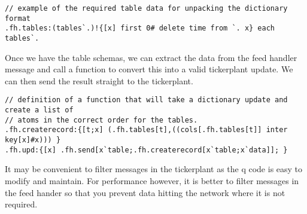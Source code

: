 \begin{lstlisting}
// example of the required table data for unpacking the dictionary format
.fh.tables:(tables`.)!{[x] first 0# delete time from `. x} each tables`.
\end{lstlisting}

Once we have the table schemas, we can extract the data from the feed handler message and call a function to convert this into
a valid tickerplant update. We can then send the result straight to the tickerplant.

\begin{lstlisting}
// definition of a function that will take a dictionary update and create a list of
// atoms in the correct order for the tables.
.fh.createrecord:{[t;x] (.fh.tables[t],((cols[.fh.tables[t]] inter key[x]#x))) }
.fh.upd:{[x] .fh.send[x`table;.fh.createrecord[x`table;x`data]]; }
\end{lstlisting}

It may be convenient to filter messages in the tickerplant as the q code is easy to modify and maintain. For performance however,
it is better to filter messages in the feed hander so that you prevent data hitting the network where it is not required.



